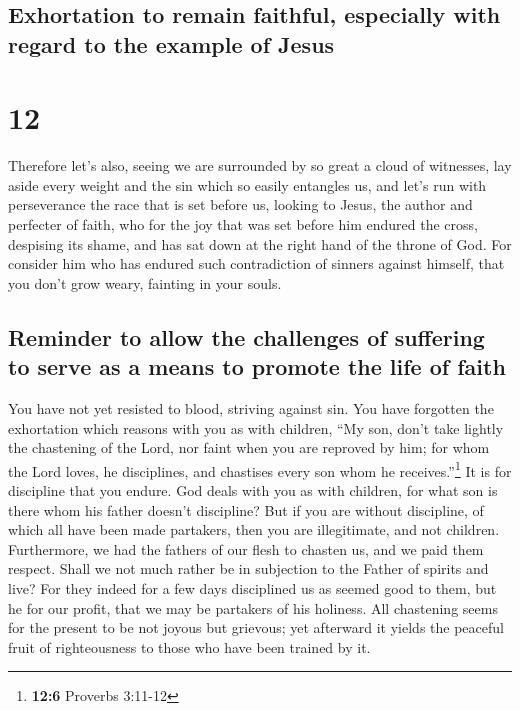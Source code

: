 \hypertarget{exhortation-to-remain-faithful-especially-with-regard-to-the-example-of-jesus}{%
\subsection{Exhortation to remain faithful, especially with regard to
the example of
Jesus}\label{exhortation-to-remain-faithful-especially-with-regard-to-the-example-of-jesus}}

\hypertarget{section-11}{%
\section{12}\label{section-11}}

 Therefore let's also, seeing we are surrounded by so
great a cloud of witnesses, lay aside every weight and the sin which so
easily entangles us, and let's run with perseverance the race that is
set before us,  looking to Jesus, the author and perfecter
of faith, who for the joy that was set before him endured the cross,
despising its shame, and has sat down at the right hand of the throne of
God.  For consider him who has endured such contradiction
of sinners against himself, that you don't grow weary, fainting in your
souls.

\hypertarget{reminder-to-allow-the-challenges-of-suffering-to-serve-as-a-means-to-promote-the-life-of-faith}{%
\subsection{Reminder to allow the challenges of suffering to serve as a
means to promote the life of
faith}\label{reminder-to-allow-the-challenges-of-suffering-to-serve-as-a-means-to-promote-the-life-of-faith}}

 You have not yet resisted to blood, striving against sin.
 You have forgotten the exhortation which reasons with you
as with children, ``My son, don't take lightly the chastening of the
Lord, nor faint when you are reproved by him;  for whom
the Lord loves, he disciplines, and chastises every son whom he
receives.''\footnote{\textbf{12:6} Proverbs 3:11-12}  It
is for discipline that you endure. God deals with you as with children,
for what son is there whom his father doesn't discipline? 
But if you are without discipline, of which all have been made
partakers, then you are illegitimate, and not children. 
Furthermore, we had the fathers of our flesh to chasten us, and we paid
them respect. Shall we not much rather be in subjection to the Father of
spirits and live?  For they indeed for a few days
disciplined us as seemed good to them, but he for our profit, that we
may be partakers of his holiness.  All chastening seems
for the present to be not joyous but grievous; yet afterward it yields
the peaceful fruit of righteousness to those who have been trained by
it.

